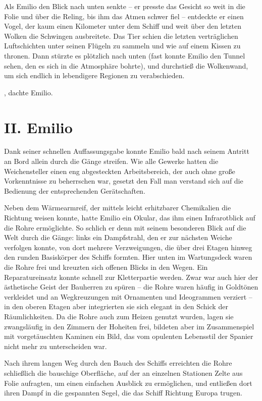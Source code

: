 Als Emilio den Blick nach unten senkte – er presste das Gesicht so
weit in die Folie und über die Reling, bis ihm das Atmen schwer
fiel – entdeckte er einen Vogel, der kaum einen Kilometer unter dem
Schiff und weit über den letzten Wolken die Schwingen ausbreitete.
Das Tier schien die letzten verträglichen Luftschichten unter
seinen Flügeln zu sammeln und wie auf einem Kissen zu thronen. Dann
stürzte es plötzlich nach unten (fast konnte Emilio den Tunnel
sehen, den es sich in die Atmosphäre bohrte), und durchstieß die
Wolkenwand, um sich endlich in lebendigere Regionen zu
verabschieden.

, dachte Emilio.

\section{II. Emilio}

Dank seiner schnellen Auffassungsgabe konnte Emilio bald nach
seinem Antritt an Bord allein durch die Gänge streifen. Wie alle
Gewerke hatten die Weichensteller einen eng abgesteckten
Arbeitsbereich, der auch ohne große Vorkenntnisse zu beherrschen
war, gesetzt den Fall man verstand sich auf die Bedienung der
entsprechenden Gerätschaften.

Neben dem Wärmearmreif, der mittels leicht erhitzbarer Chemikalien
die Richtung weisen konnte, hatte Emilio ein Okular, das ihm einen
Infrarotblick auf die Rohre ermöglichte. So schlich er denn mit
seinem besonderen Blick auf die Welt durch die Gänge: links ein
Dampfstrahl, den er zur nächsten Weiche verfolgen konnte, von dort
mehrere Verzweigungen, die über drei Etagen hinweg den runden
Basiskörper des Schiffs formten. Hier unten im Wartungsdeck waren
die Rohre frei und kreuzten sich offenen Blicks in den Wegen. Ein
Reparatureinsatz konnte schnell zur Kletterpartie werden. Zwar war
auch hier der ästhetische Geist der Bauherren zu spüren – die Rohre
waren häufig in Goldtönen verkleidet und an Wegkreuzungen mit
Ornamenten und Ideogrammen verziert – in den oberen Etagen aber
integrierten sie sich elegant in den Schick der Räumlichkeiten. Da
die Rohre auch zum Heizen genutzt wurden, lagen sie zwangsläufig in
den Zimmern der Hoheiten frei, bildeten aber im Zusammenspiel mit
vorgetäuschten Kaminen ein Bild, das vom opulenten Lebensstil der
Spanier nicht mehr zu unterscheiden war.

Nach ihrem langen Weg durch den Bauch des Schiffs erreichten die
Rohre schließlich die bauschige Oberfläche, auf der an einzelnen
Stationen Zelte aus Folie aufragten, um einen einfachen Ausblick zu
ermöglichen, und entließen dort ihren Dampf in die gespannten
Segel, die das Schiff Richtung Europa trugen.

